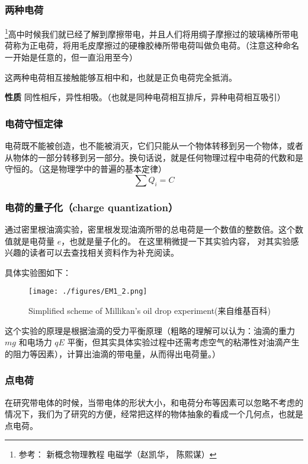 
\subsubsection{两种电荷}
\footnote{参考： 新概念物理教程 电磁学（赵凯华， 陈熙谋）}高中时候我们就已经了解到摩擦带电，并且人们将用绸子摩擦过的玻璃棒所带电荷称为正电荷，将用毛皮摩擦过的硬橡胶棒所带电荷叫做负电荷。（注意这种命名一开始是任意的，但一直沿用至今）

这两种电荷相互接触能够互相中和，也就是正负电荷完全抵消。

\textbf{性质} 同性相斥，异性相吸。（也就是同种电荷相互排斥，异种电荷相互吸引）

\subsubsection{电荷守恒定律}
电荷既不能被创造，也不能被消灭，它们只能从一个物体转移到另一个物体，或者从物体的一部分转移到另一部分。换句话说，就是任何物理过程中电荷的代数和是守恒的。（这是物理学中的普遍的基本定律）
\begin{equation}
\sum Q_i=C
\end{equation}

\subsubsection{电荷的量子化（charge quantization）}
 通过密里根油滴实验，密里根发现油滴所带的总电荷是一个数值的整数倍。这个数值就是电荷量 $e$，也就是量子化的。
 在这里稍微提一下其实验内容， 对其实验感兴趣的读者可以去查找相关资料作为补充阅读。

具体实验图如下：

\begin{figure}[ht]
\centering
\texttt{[image: ./figures/EM1\_2.png]}
\caption{Simplified scheme of Millikan's oil drop experiment(来自维基百科)} \label{EM1_fig1}
\end{figure}

这个实验的原理是根据油滴的受力平衡原理（粗略的理解可以认为：油滴的重力 $mg$ 和电场力 $qE$ 平衡，但其实具体实验过程中还需考虑空气的粘滞性对油滴产生的阻力等因素），计算出油滴的带电量，从而得出电荷量。）

\subsubsection{点电荷}

在研究带电体的时候，当带电体的形状大小，和电荷分布等因素可以忽略不考虑的情况下，我们为了研究的方便，经常把这样的物体抽象的看成一个几何点，也就是点电荷。

